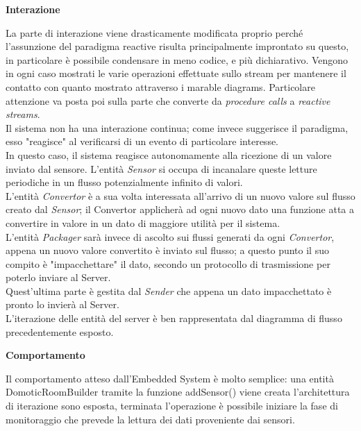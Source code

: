 \begin{center}
  \textbf{Interazione}
\end{center}

La parte di interazione viene drasticamente modificata proprio perch\'e l'assunzione del paradigma reactive risulta principalmente improntato su questo, in particolare \`e possibile condensare in meno codice, e pi\`u dichiarativo. Vengono in ogni caso mostrati le varie operazioni effettuate sullo stream per mantenere il contatto con quanto mostrato attraverso i marable diagrams. Particolare attenzione va posta poi sulla parte che converte da \textit{procedure calls} a \textit{reactive streams}. \\
Il sistema non ha una interazione continua; come invece suggerisce il paradigma, esso "reagisce" al verificarsi di un evento di particolare interesse.\\
In questo caso, il sistema reagisce autonomamente alla ricezione di un valore inviato dal sensore. L'entit\`a \textit{Sensor} si occupa di incanalare queste letture periodiche in un flusso potenzialmente infinito di valori.\\
L'entit\`a \textit{Convertor} \`e a sua volta interessata all'arrivo di un nuovo valore sul flusso creato dal \textit{Sensor}; il Convertor applicher\`a ad ogni nuovo dato una funzione atta a convertire in valore in un dato di maggiore utilità per il sistema.\\
L'entit\`a \textit{Packager} sarà invece di ascolto sui flussi generati da ogni \textit{Convertor}, appena un nuovo valore convertito è inviato sul flusso; a questo punto il suo compito \`e "impacchettare" il dato, secondo un protocollo di trasmissione per poterlo inviare al Server.\\
Quest'ultima parte \`e gestita dal \textit{Sender} che appena un dato impacchettato \`e pronto lo invier\`a al Server.\\
L'iterazione delle entit\`a del server \`e ben rappresentata dal diagramma di flusso precedentemente esposto.

\begin{center}
\textbf{Comportamento}
\end{center}

Il comportamento atteso dall'Embedded System \`e molto semplice: una entità DomoticRoomBuilder tramite la funzione addSensor() viene creata l'architettura di iterazione sono esposta, terminata l'operazione \`e possibile iniziare la fase di monitoraggio che prevede la lettura dei dati proveniente dai sensori.
 
